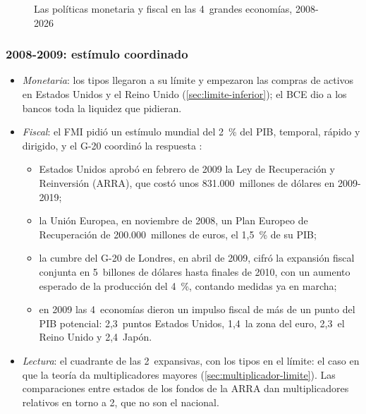 \documentclass[11pt]{article}
\begin{document}
\begin{figure}[H]
\centering
\caption{Las políticas monetaria y fiscal en las 4~grandes economías, 2008-2026}\label{fig:cronologia-politicas}
\end{figure}

\subsubsection{2008-2009: estímulo coordinado}\label{sec:fase-estimulo}

\begin{itemize}
\item \emph{Monetaria}: los tipos llegaron a su límite y empezaron las compras de activos en Estados Unidos y el Reino Unido (\ref{sec:limite-inferior}); el BCE dio a los bancos toda la liquidez que pidieran.
\item \emph{Fiscal}: el FMI pidió un estímulo mundial del 2~\% del PIB, temporal, rápido y dirigido\nocite{SpilimbergoEtAl2008Fiscal}, y el G-20 coordinó la respuesta :
  \begin{itemize}
  \item Estados Unidos aprobó en febrero de 2009 la Ley de Recuperación y Reinversión (ARRA), que costó unos 831.000~millones de dólares en 2009-2019\nocite{CBO2012ARRA};
  \item la Unión Europea, en noviembre de 2008, un Plan Europeo de Recuperación de 200.000~millones de euros, el 1,5~\% de su PIB\nocite{CE2008PERE};
  \item la cumbre del G-20 de Londres, en abril de 2009, cifró la expansión fiscal conjunta en 5~billones de dólares hasta finales de 2010, con un aumento esperado de la producción del 4~\%, contando medidas ya en marcha\nocite{G202009Londres};
  \item en 2009 las 4~economías dieron un impulso fiscal de más de un punto del PIB potencial: 2,3~puntos Estados Unidos, 1,4~la zona del euro, 2,3~el Reino Unido y 2,4~Japón\nocite{FMI2026FMdatos}.
  \end{itemize}
\item \emph{Lectura}: el cuadrante de las 2~expansivas, con los tipos en el límite: el caso en que la teoría da multiplicadores mayores (\ref{sec:multiplicador-limite}). Las comparaciones entre estados de los fondos de la ARRA dan multiplicadores relativos en torno a 2, que no son el nacional\nocite{ChodorowReich2019Geographic}.
\end{itemize}
\end{document}
